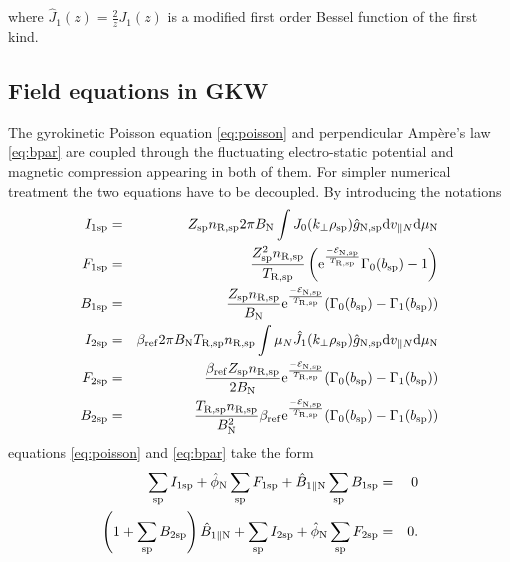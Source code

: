 where $\hat{J}_1(z) = \frac{2}{z} J_1(z)$ is a modified first order Bessel function of the first kind.

\subsection{Field equations in GKW} \label{sec:gkw}
The gyrokinetic Poisson equation \ref{eq:poisson} and perpendicular Amp\`ere's law \ref{eq:bpar} are coupled through the fluctuating electro-static potential and magnetic compression appearing in both of them. For simpler numerical treatment the two equations have to be decoupled. By introducing the notations
\begin{eqnarray*}
	I_{1 \mathrm{sp}} &=& Z_{\mathrm{sp}} n_{\mathrm{R,sp}} 2 \pi B_{\mathrm{N}} \int J_0(k_{\perp} \rho_{\mathrm{sp}}) \hat{g}_{\mathrm{N,sp}} \mathrm{d} v_{\parallel N} \mathrm{d} \mu_{\mathrm{N}} \\
	F_{1 \mathrm{sp}} &=& \frac{Z^2_{\mathrm{sp}} n_{\mathrm{R,sp}}}{T_{\mathrm{R,sp}}} \left( \mathrm{e}^{\frac{-\mathcal{E}_{\mathrm{N,sp}}}{T_{\mathrm{R,sp}}}} \Gamma_0(b_{\mathrm{sp}}) - 1 \right) \\
	B_{1 \mathrm{sp}} &=& \frac{Z_{\mathrm{sp}} n_{\mathrm{R,sp}}}{B_{\mathrm{N}}} \mathrm{e}^{\frac{-\mathcal{E}_{\mathrm{N,sp}}}{T_{\mathrm{R,sp}}}} (\Gamma_0(b_{\mathrm{sp}}) - \Gamma_1(b_{\mathrm{sp}})) \\
	I_{2 \mathrm{sp}} &=& \beta_{\mathrm{ref}} 2 \pi B_{\mathrm{N}} T_{\mathrm{R,sp}} n_{\mathrm{R,sp}} \int \mu_{N} \hat{J}_1(k_{\perp} \rho_{\mathrm{sp}}) \hat{g}_{\mathrm{N,sp}} \mathrm{d}v_{\parallel N} \mathrm{d} \mu_{\mathrm{N}} \\
	F_{2 \mathrm{sp}} &=& \frac{\beta_{\mathrm{ref}} Z_{\mathrm{sp}} n_{\mathrm{R,sp}}}{2 B_{\mathrm{N}}} \mathrm{e}^{\frac{-\mathcal{E}_{\mathrm{N,sp}}}{T_{\mathrm{R,sp}}}} ( \Gamma_0(b_{\mathrm{sp}}) - \Gamma_1(b_{\mathrm{sp}}) )  \\
	B_{2 \mathrm{sp}} &=& \frac{T_{\mathrm{R,sp}} n_{\mathrm{R,sp}}}{B_{\mathrm{N}}^2} \beta_{\mathrm{ref}} \mathrm{e}^{\frac{-\mathcal{E}_{\mathrm{N,sp}}}{T_{\mathrm{R,sp}}}} ( \Gamma_0(b_{\mathrm{sp}}) - \Gamma_1(b_{\mathrm{sp}}) )
\end{eqnarray*}
equations \ref{eq:poisson} and \ref{eq:bpar} take the form
\begin{eqnarray*}
	\sum_{\mathrm{sp}} I_{1 \mathrm{sp}} + \hat{\phi}_{\mathrm{N}} \sum_{\mathrm{sp}} F_{1 \mathrm{sp}} + \hat{B}_{1 \parallel \mathrm{N}} \sum_{\mathrm{sp}} B_{1 \mathrm{sp}} &=& 0 \\
	\left( 1 + \sum_{\mathrm{sp}} B_{2 \mathrm{sp}} \right) \hat{B}_{1 \parallel \mathrm{N}} + \sum_{\mathrm{sp}} I_{2 \mathrm{sp}} + \hat{\phi}_{\mathrm{N}} \sum_{\mathrm{sp}} F_{2 \mathrm{sp}} &=& 0.
\end{eqnarray*}
